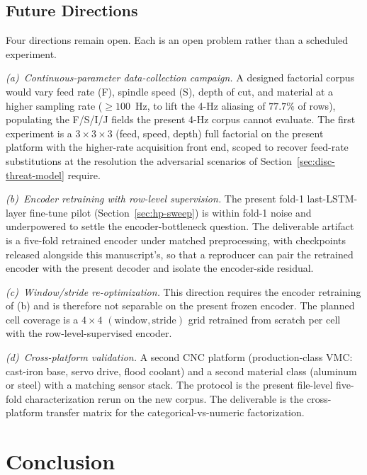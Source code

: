 \documentclass[sensors,article,submit,moreauthors,pdftex]{Definitions/mdpi}
\begin{document}
\subsection{Future Directions}
\label{sec:roadmap}

Four directions remain open. Each is an open problem rather than a scheduled experiment.

\emph{(a)~Continuous-parameter data-collection campaign.} A designed factorial corpus would vary feed rate (F), spindle speed (S), depth of cut, and material at a higher sampling rate ($\geq\!100$~Hz, to lift the 4-Hz aliasing of $77.7\%$ of rows), populating the F/S/I/J fields the present 4-Hz corpus cannot evaluate. The first experiment is a $3\!\times\!3\!\times\!3$ (feed, speed, depth) full factorial on the present platform with the higher-rate acquisition front end, scoped to recover feed-rate substitutions at the resolution the adversarial scenarios of Section~\ref{sec:disc-threat-model} require.

\emph{(b)~Encoder retraining with row-level supervision.} The present fold-1 last-LSTM-layer fine-tune pilot (Section~\ref{sec:hp-sweep}) is within fold-1 noise and underpowered to settle the encoder-bottleneck question. The deliverable artifact is a five-fold retrained encoder under matched preprocessing, with checkpoints released alongside this manuscript's, so that a reproducer can pair the retrained encoder with the present decoder and isolate the encoder-side residual.

\emph{(c)~Window/stride re-optimization.} This direction requires the encoder retraining of (b) and is therefore not separable on the present frozen encoder. The planned cell coverage is a $4\!\times\!4$ $(\text{window}, \text{stride})$ grid retrained from scratch per cell with the row-level-supervised encoder.

\emph{(d)~Cross-platform validation.} A second CNC platform (production-class VMC: cast-iron base, servo drive, flood coolant) and a second material class (aluminum or steel) with a matching sensor stack. The protocol is the present file-level five-fold characterization rerun on the new corpus. The deliverable is the cross-platform transfer matrix for the categorical-vs-numeric factorization.

\section{Conclusion}
\label{sec:conclusion}
\end{document}

